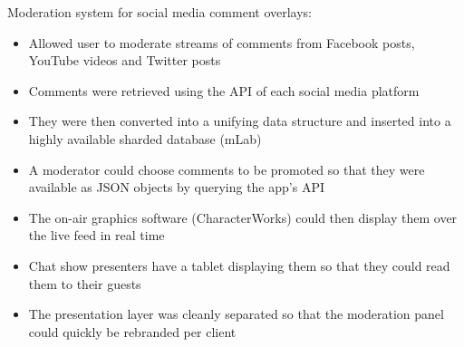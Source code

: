 \item Moderation system for social media comment overlays:
\begin{itemize}
    \item Allowed user to moderate streams of comments from Facebook posts, YouTube videos and Twitter posts
    \item Comments were retrieved using the API of each social media platform
    \item They were then converted into a unifying data structure and inserted into a highly available sharded database (mLab)
    \item A moderator could choose comments to be promoted so that they were available as JSON objects by querying the app's API
    \item The on-air graphics software (CharacterWorks) could then display them over the live feed in real time
    \item Chat show presenters have a tablet displaying them so that they could read them to their guests
    \item The presentation layer was cleanly separated so that the moderation panel could quickly be rebranded per client
\end{itemize}
